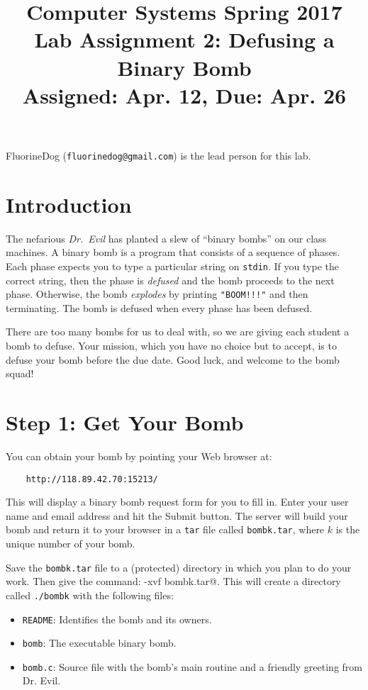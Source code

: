 \documentclass[11pt]{article}
\title{Computer Systems Spring 2017\\
Lab Assignment 2: Defusing a Binary Bomb\\
Assigned: Apr. 12, Due: Apr. 26\\
}
\author{}
\date{}
\begin{document}
\maketitle

FluorineDog ({\tt fluorinedog@gmail.com}) is the lead person for this lab.

\section{Introduction}

The nefarious {\em Dr.~Evil} has planted a slew of ``binary bombs'' on
our class machines.  A binary bomb is a program that consists of a
sequence of phases. Each phase expects you to type a particular string
on \texttt{stdin}.  If you type the correct string, then the phase is
{\em defused} and the bomb proceeds to the next phase. Otherwise, the
bomb {\em explodes} by printing \verb."BOOM!!!". and then
terminating. The bomb is defused when every phase has been defused.

There are too many bombs for us to deal with, so we are giving each
student a bomb to defuse.  Your mission, which you have no choice but to
accept, is to defuse your bomb before the due date.  Good luck, and
welcome to the bomb squad!

\section*{Step 1: Get Your Bomb}

You can obtain your bomb by pointing your Web browser at:

\begin{verbatim}
    http://118.89.42.70:15213/
\end{verbatim}

This will display a binary bomb request form for you to fill in.
Enter your user name and email address and hit the Submit button.  The
server will build your bomb and return it to your browser in a
\texttt{tar} file called \texttt{bombk.tar}, where $k$ is the unique
number of your bomb.

Save the \texttt{bombk.tar} file to a (protected) directory
in which you plan to do your work.  Then give the command: 
\verb@tar -xvf bombk.tar@.  This will create a directory called
\texttt{./bombk} with the following files:
\begin{itemize}
\item \texttt{README}: Identifies the bomb and its owners.
\item \texttt{bomb}: The executable binary bomb.
\item \texttt{bomb.c}: Source file with the bomb's main routine and a friendly greeting from Dr. Evil.
\end{itemize}
\end{document}
